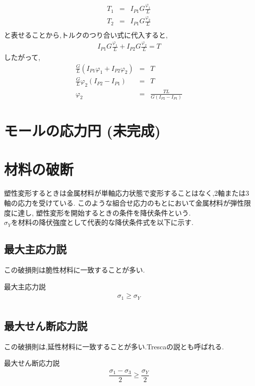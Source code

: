 \documentclass[a4paper]{jsarticle}
\begin{document}
\begin{enumerate}[(1)]
          \begin{eqnarray*}
              T_1&=&I_{P1}G\frac{\varphi_1}{L}\\
              T_2&=&I_{P1}G\frac{\varphi_2}{L}\\
          \end{eqnarray*}
          と表せることから,トルクのつり合い式に代入すると,
          \begin{eqnarray*}
              I_{P1}G\frac{\varphi_1}{L}+I_{P2}G\frac{\varphi_2}{L}=T
          \end{eqnarray*}
          したがって,
          \begin{eqnarray*}
              \frac{G}{L}\left(I_{P1}\varphi_1+I_{P2}\varphi_2\right)&=&T\\
              \frac{G}{L}\varphi_2\left(I_{P2}-I_{P1}\right)&=&T\\
              \varphi_2&=&\frac{TL}{G\left(I_{P2}-I_{P1}\right)}
          \end{eqnarray*}
\end{enumerate}
\section{モールの応力円 (未完成)}
\section{材料の破断}
塑性変形するときは金属材料が単軸応力状態で変形することはなく,2軸または3軸の応力を受けている.
このような組合せ応力のもとにおいて金属材料が弾性限度に達し,
塑性変形を開始するときの条件を降伏条件という.\\
$\sigma_Y$を材料の降伏強度として代表的な降伏条件式を以下に示す.
\subsection{最大主応力説}
この破損則は脆性材料に一致することが多い.
\begin{itembox}[l]{最大主応力説}
    \begin{eqnarray*}
        \sigma_1\geq\sigma_Y\\
    \end{eqnarray*}
\end{itembox}
\subsection{最大せん断応力説}
この破損則は,延性材料に一致することが多い.Trescaの説とも呼ばれる.
\begin{itembox}[l]{最大せん断応力説}
    \begin{eqnarray*}
        \dfrac{\sigma_1-\sigma_3}{2}\geq\dfrac{\sigma_Y}{2}\\
    \end{eqnarray*}
\end{itembox}
\end{document}
